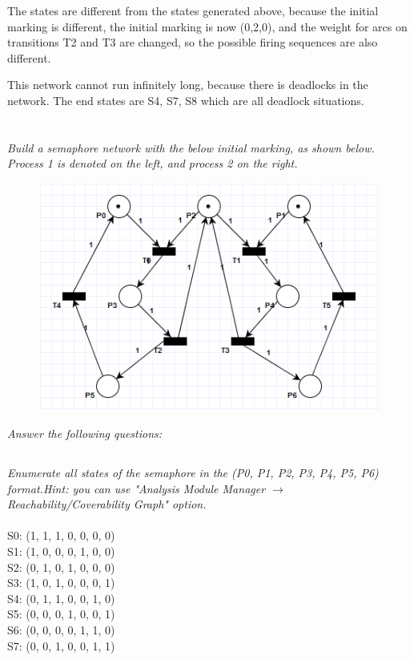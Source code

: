 \documentclass[letterpaper]{article}
\begin{document}
The states are different from the states generated above, because the initial
marking is different, the initial marking is now (0,2,0), and the weight for arcs
on transitions T2 and T3 are changed, so the possible firing sequences are also
different.

This network cannot run infinitely long, because there is deadlocks in the network.
The end states are S4, S7, S8 which are all deadlock situations.



\section{}

\textit{Build a semaphore network with the below initial marking, as shown below. Process 1 is denoted on the left, and process 2 on the right.
}
\begin{figure}[H]
 \centering
 \includegraphics[width=\textwidth]{image3.png}
\end{figure}

\textit{Answer the following questions:}

\subsection{}
\textit{Enumerate all states of the semaphore in the (P0, P1, P2, P3, P4, P5, P6) format.Hint: you can use "Analysis Module Manager $\rightarrow$ Reachability/Coverability Graph" option.
}
\\
\\S0: (1, 1, 1, 0, 0, 0, 0)
\\S1: (1, 0, 0, 0, 1, 0, 0)
\\S2: (0, 1, 0, 1, 0, 0, 0)
\\S3: (1, 0, 1, 0, 0, 0, 1)
\\S4: (0, 1, 1, 0, 0, 1, 0)
\\S5: (0, 0, 0, 1, 0, 0, 1)
\\S6: (0, 0, 0, 0, 1, 1, 0)
\\S7: (0, 0, 1, 0, 0, 1, 1)
\end{document}
